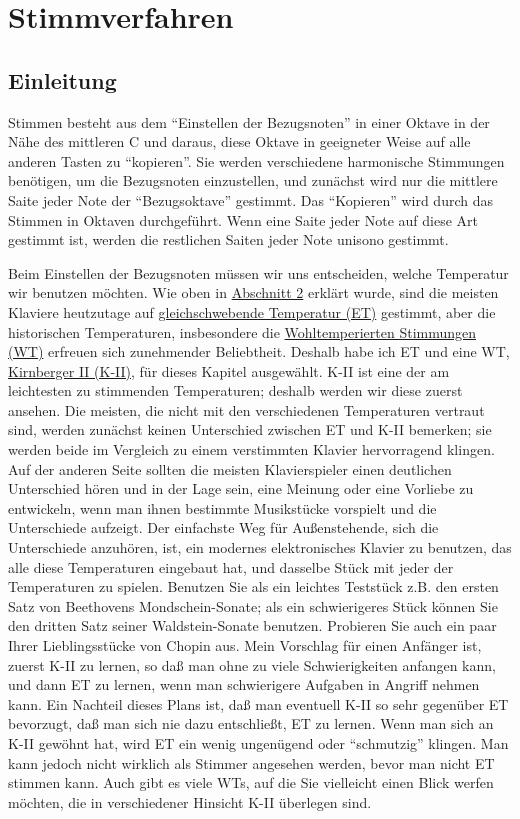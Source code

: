 
\section{Stimmverfahren}
\label{c2_6}

\subsection{Einleitung}
\label{c2_6a}

Stimmen besteht aus dem \enquote{Einstellen der Bezugsnoten} in einer Oktave in der Nähe des mittleren C und daraus, diese Oktave in geeigneter Weise auf alle anderen Tasten zu \enquote{kopieren}.
Sie werden verschiedene harmonische Stimmungen benötigen, um die Bezugsnoten einzustellen, und zunächst wird nur die mittlere Saite jeder Note der \enquote{Bezugsoktave} gestimmt.
Das \enquote{Kopieren} wird durch das Stimmen in Oktaven durchgeführt.
Wenn eine Saite jeder Note auf diese Art gestimmt ist, werden die restlichen Saiten jeder Note unisono gestimmt.

Beim Einstellen der Bezugsnoten müssen wir uns entscheiden, welche Temperatur wir benutzen möchten.
Wie oben in \hyperref[c2_2]{Abschnitt 2} erklärt wurde, sind die meisten Klaviere heutzutage auf \hyperref[et1]{gleichschwebende Temperatur (ET)} gestimmt, aber die historischen Temperaturen, insbesondere die \hyperref[c2_2_wtk2]{Wohltemperierten Stimmungen (WT)} erfreuen sich zunehmender Beliebtheit.
Deshalb habe ich ET und eine WT, \hyperref[c2_6_kirn]{Kirnberger II (K-II)}, für dieses Kapitel ausgewählt.
K-II ist eine der am leichtesten zu stimmenden Temperaturen; deshalb werden wir diese zuerst ansehen.
Die meisten, die nicht mit den verschiedenen Temperaturen vertraut sind, werden zunächst keinen Unterschied zwischen ET und K-II bemerken; sie werden beide im Vergleich zu einem verstimmten Klavier hervorragend klingen.
Auf der anderen Seite sollten die meisten Klavierspieler einen deutlichen Unterschied hören und in der Lage sein, eine Meinung oder eine Vorliebe zu entwickeln, wenn man ihnen bestimmte Musikstücke vorspielt und die Unterschiede aufzeigt.
Der einfachste Weg für Außenstehende, sich die Unterschiede anzuhören, ist, ein modernes elektronisches Klavier zu benutzen, das alle diese Temperaturen eingebaut hat, und dasselbe Stück mit jeder der Temperaturen zu spielen.
Benutzen Sie als ein leichtes Teststück z.B. den ersten Satz von Beethovens Mondschein-Sonate; als ein schwierigeres Stück können Sie den dritten Satz seiner Waldstein-Sonate benutzen.
Probieren Sie auch ein paar Ihrer Lieblingsstücke von Chopin aus.
Mein Vorschlag für einen Anfänger ist, zuerst K-II zu lernen, so daß man ohne zu viele Schwierigkeiten anfangen kann, und dann ET zu lernen, wenn man schwierigere Aufgaben in Angriff nehmen kann.
Ein Nachteil dieses Plans ist, daß man eventuell K-II so sehr gegenüber ET bevorzugt, daß man sich nie dazu entschließt, ET zu lernen.
Wenn man sich an K-II gewöhnt hat, wird ET ein wenig ungenügend oder \enquote{schmutzig} klingen.
Man kann jedoch nicht wirklich als Stimmer angesehen werden, bevor man nicht ET stimmen kann.
Auch gibt es viele WTs, auf die Sie vielleicht einen Blick werfen möchten, die in verschiedener Hinsicht K-II überlegen sind.


